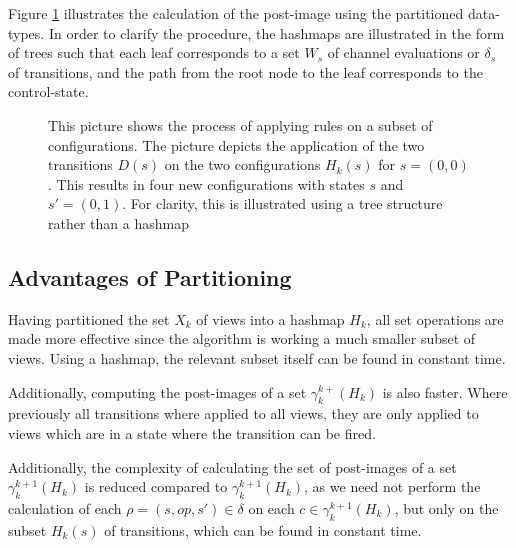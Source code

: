 Figure \ref{applyrule} illustrates the calculation of the post-image using the partitioned data-types. In order to clarify the procedure, the hashmaps are illustrated in the form of trees such that each leaf corresponds to a set $W_s$ of channel evaluations or $\delta_s$ of transitions, and the path from the root node to the leaf corresponds to the control-state.



\begin{figure}
\centering
\def\svgwidth{\columnwidth}

\caption{This picture shows the process of applying rules on a subset of configurations. The picture depicts the application of the two transitions $D(s)$ on the two configurations $H_k(s)$ for $s=(0,0)$. This results in four new configurations with states $s$ and $s' = (0,1)$. For clarity, this is illustrated using a tree structure rather than a hashmap}
\label{applyrule}
\end{figure}



\subsection{Advantages of Partitioning}
Having partitioned the set $X_k$ of views into a hashmap $H_k$, all set operations are made more effective since the algorithm is working a much smaller subset of views. Using a hashmap, the relevant subset itself can be found in constant time.

Additionally, computing the post-images of a set $\gamma_k^{k+}(H_k)$ is also faster. Where previously all transitions where applied to all views, they are only applied to views which are in a state where the transition can be fired.

Additionally, the complexity of calculating the set of post-images of a set $\gamma_k^{k+1}(H_k)$ is reduced compared to $\gamma_k^{k+1}(H_k)$, as we need not perform the calculation of each $\rho = (s, op, s') \in \delta$ on each $c \in \gamma_k^{k+1}(H_k)$, but only on the subset $H_k(s)$ of transitions, which can be found in constant time.


